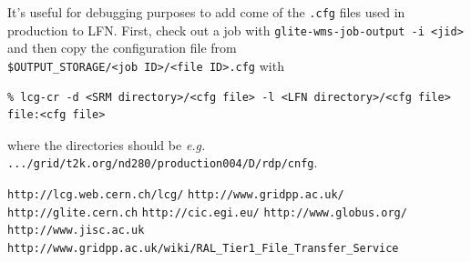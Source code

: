 \documentclass[11pt]{article}
\begin{document}
It's useful for debugging purposes to add come of the \verb+.cfg+
files used in production to LFN. First, check out a job with
\verb+glite-wms-job-output -i <jid>+ and then copy the configuration
file from\\ \verb+$OUTPUT_STORAGE/<job ID>/<file ID>.cfg+ with
\begin{verbatim}
% lcg-cr -d <SRM directory>/<cfg file> -l <LFN directory>/<cfg file> file:<cfg file> 
\end{verbatim}
where the directories should be \textit{e.g.} \verb+.../grid/t2k.org/nd280/production004/D/rdp/cnfg+.

\clearpage
\begin{thebibliography}{}

 \verb+http://lcg.web.cern.ch/lcg/+
 \verb+http://www.gridpp.ac.uk/+
 \verb+http://glite.cern.ch+
 \verb+http://cic.egi.eu/+
 \verb+http://www.globus.org/+
 \verb+http://www.jisc.ac.uk+
 \verb+http://www.gridpp.ac.uk/wiki/RAL_Tier1_File_Transfer_Service+

\end{thebibliography}
\end{document}
